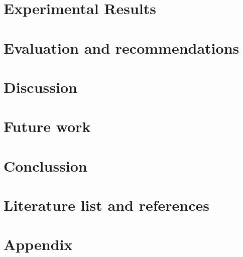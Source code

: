 \documentclass[12pt]{article} %
\begin{document}
\section{Experimental Results}

\section{Evaluation and recommendations}

\section{Discussion}

\section{Future work}

\section{Conclussion}
\section{Literature list and references}
\section{Appendix}




\newpage
\appendix
\label{appendix}
\end{document}
